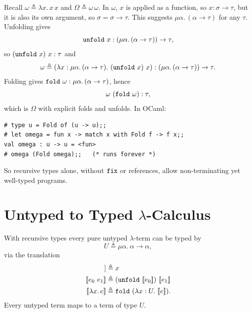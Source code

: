 Recall $\omega \triangleq \lambda x.\, x\, x$ and $\Omega \triangleq \omega\,\omega$.
In $\omega$, $x$ is applied as a function, so $x : \sigma \to \tau$, but it is also
its own argument, so $\sigma = \sigma \to \tau$. This suggests
$\mu\alpha.\,(\alpha \to \tau)$ for any $\tau$. Unfolding gives
\[
\mathtt{unfold}\ x : (\mu\alpha.\,(\alpha \to \tau)) \to \tau,
\]
so $(\mathtt{unfold}\ x)\ x : \tau$ and
\[
\omega \triangleq (\lambda x : \mu\alpha.\,(\alpha \to \tau).\ (\mathtt{unfold}\ x)\ x)
  : (\mu\alpha.\,(\alpha \to \tau)) \to \tau.
\]
Folding gives $\mathtt{fold}\ \omega : \mu\alpha.\,(\alpha \to \tau)$, hence
\[
\omega\ (\ttkw{fold}\ \omega) : \tau,
\]
which is $\Omega$ with explicit folds and unfolds. In OCaml:
\begin{verbatim}
# type u = Fold of (u -> u);;
# let omega = fun x -> match x with Fold f -> f x;;
val omega : u -> u = <fun>
# omega (Fold omega);;   (* runs forever *)
\end{verbatim}
So recursive types alone, without $\mathtt{fix}$ or references, allow
non-terminating yet well-typed programs.

\section{Untyped to Typed $\lambda$-Calculus}

With recursive types every pure untyped $\lambda$-term can be typed by
\[
U \triangleq \mu\alpha.\ \alpha \to \alpha,
\]
via the translation
\begin{align*}
[\![x]\!] &\triangleq x \\
[\![e_0\ e_1]\!] &\triangleq (\ttkw{unfold}\ [\![e_0]\!])\ [\![e_1]\!] \\
[\![\lambda x.\, e]\!] &\triangleq \ttkw{fold}\ (\lambda x : U.\ [\![e]\!]).
\end{align*}
Every untyped term maps to a term of type $U$.
% 
